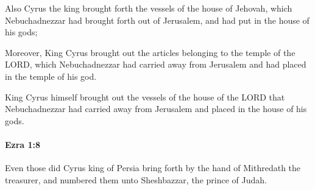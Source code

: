 			\begin{versebox}
					\item[BHS] 
					\item[LXX] 
					\item[ASV] Also Cyrus the king brought forth the vessels of the house of Jehovah, which Nebuchadnezzar had brought forth out of Jerusalem, and had put in the house of his gods;
					\item[NIV] Moreover, King Cyrus brought out the articles belonging to the temple of the LORD, which Nebuchadnezzar had carried away from Jerusalem and had placed in the temple of his god.
					\item[NRSV] King Cyrus himself brought out the vessels of the house of the LORD that Nebuchadnezzar had carried away from Jerusalem and placed in the house of his gods.
			\end{versebox}

		\paragraph{Ezra 1:8} %
			\label{EZRA-1-8}

			Even those did Cyrus king of Persia bring forth by the hand of Mithredath the treasurer, and numbered them unto Sheshbazzar, the prince of Judah.

